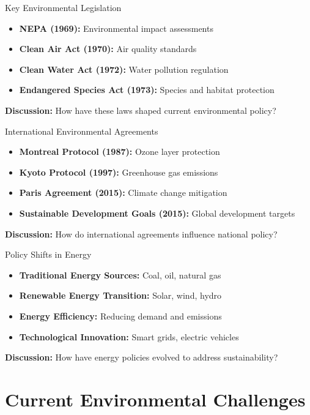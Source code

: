 \documentclass[11pt, aspectratio=169]{beamer}
\begin{document}
\begin{frame}{Key Environmental Legislation}
    \begin{itemize}
        \item \textbf{NEPA (1969):} Environmental impact assessments
        \item \textbf{Clean Air Act (1970):} Air quality standards
        \item \textbf{Clean Water Act (1972):} Water pollution regulation
        \item \textbf{Endangered Species Act (1973):} Species and habitat protection
    \end{itemize}
    \pause
    \textbf{Discussion:} How have these laws shaped current environmental policy?
\end{frame}

\begin{frame}{International Environmental Agreements}
    \begin{itemize}
        \item \textbf{Montreal Protocol (1987):} Ozone layer protection
        \item \textbf{Kyoto Protocol (1997):} Greenhouse gas emissions
        \item \textbf{Paris Agreement (2015):} Climate change mitigation
        \item \textbf{Sustainable Development Goals (2015):} Global development targets
    \end{itemize}
    \pause
    \textbf{Discussion:} How do international agreements influence national policy?
\end{frame}

\begin{frame}{Policy Shifts in Energy}
    \begin{itemize}
        \item \textbf{Traditional Energy Sources:} Coal, oil, natural gas
        \item \textbf{Renewable Energy Transition:} Solar, wind, hydro
        \item \textbf{Energy Efficiency:} Reducing demand and emissions
        \item \textbf{Technological Innovation:} Smart grids, electric vehicles
    \end{itemize}
    \pause
    \textbf{Discussion:} How have energy policies evolved to address sustainability?
\end{frame}

\section{Current Environmental Challenges}
\end{document}
